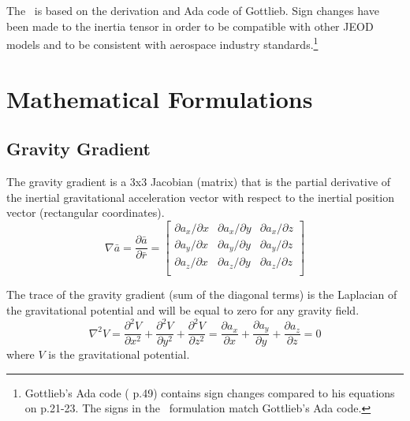 The \gravitytorqueDesc\ is based on the derivation and Ada code 
of Gottlieb\cite{JSC23762}. Sign changes have been made to the inertia
tensor in order to be compatible with other JEOD models and to be consistent with 
aerospace industry standards.\footnote{Gottlieb's Ada code (\cite{JSC23762} p.49) contains
sign changes compared to his equations on p.21-23. The signs in the
\gravitytorqueDesc\ formulation match Gottlieb's Ada code.}


\section{Mathematical Formulations}

\subsection{Gravity Gradient}
The gravity gradient is a 3x3 Jacobian (matrix) that is the partial derivative
of the inertial gravitational acceleration vector with respect to the inertial
position vector (rectangular coordinates).
\begin{equation}
\nabla \bar{a} = \frac{\partial\bar{a}}{\partial\bar{r}} = 
\left[
\begin{array}{ccc}
\partial{a_x}/\partial{x} & \partial{a_x}/\partial{y} & \partial{a_x}/\partial{z} \\
\partial{a_y}/\partial{x} & \partial{a_y}/\partial{y} & \partial{a_y}/\partial{z} \\
\partial{a_z}/\partial{x} & \partial{a_z}/\partial{y} & \partial{a_z}/\partial{z} \\
\end{array}
\right]
\end{equation}

The trace of the gravity gradient (sum of the diagonal terms) is the Laplacian of
the gravitational potential and will be 
equal to zero for any gravity field.
\begin{equation}
\nabla^2 V = \frac{\partial^2V}{\partial x^2}+\frac{\partial^2V}{\partial y^2}+\frac{\partial^2V}{\partial z^2} =
\frac{\partial a_x}{\partial x}+\frac{\partial a_y}{\partial y}+\frac{\partial a_z}{\partial z} = 0
\end{equation}
where $V$ is the gravitational potential\cite{kaula1966}.



